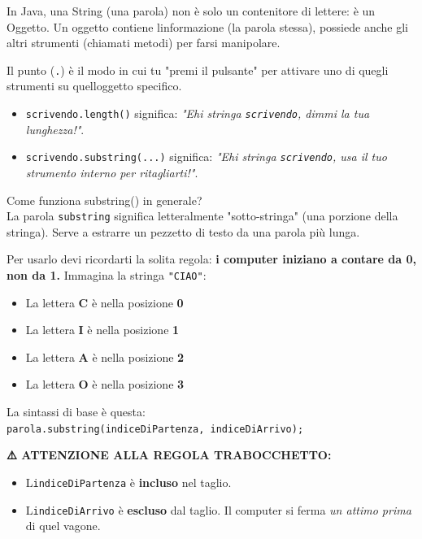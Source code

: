 \documentclass[
]{article}
\begin{document}
In Java, una String (una parola) non è solo un contenitore di lettere: è
un Oggetto. Un oggetto contiene l\textquotesingle informazione (la
parola stessa), possiede anche gli altri strumenti (chiamati metodi) per
farsi manipolare.

Il punto (\texttt{.}) è il modo in cui tu "premi il pulsante" per
attivare uno di quegli strumenti su quell\textquotesingle oggetto
specifico.

\begin{itemize}
\item
  \texttt{scrivendo.length()} significa: \emph{"Ehi stringa
  \texttt{scrivendo}, dimmi la tua lunghezza!"}.
\item
  \texttt{scrivendo.substring(...)} significa: \emph{"Ehi stringa
  \texttt{scrivendo}, usa il tuo strumento interno per ritagliarti!"}.
\end{itemize}

Come funziona substring() in generale?\\
La parola \texttt{substring} significa letteralmente "sotto-stringa"
(una porzione della stringa). Serve a estrarre un pezzetto di testo da
una parola più lunga.

Per usarlo devi ricordarti la solita regola: \textbf{i computer iniziano
a contare da 0, non da 1.} Immagina la stringa \texttt{"CIAO"}:

\begin{itemize}
\item
  La lettera \textbf{C} è nella posizione \textbf{0}
\item
  La lettera \textbf{I} è nella posizione \textbf{1}
\item
  La lettera \textbf{A} è nella posizione \textbf{2}
\item
  La lettera \textbf{O} è nella posizione \textbf{3}
\end{itemize}

La sintassi di base è questa:
\texttt{parola.substring(indiceDiPartenza,\ indiceDiArrivo);}

\textbf{⚠️ ATTENZIONE ALLA REGOLA TRABOCCHETTO:}

\begin{itemize}
\item
  L\textquotesingle{}\texttt{indiceDiPartenza} è \textbf{incluso} nel
  taglio.
\item
  L\textquotesingle{}\texttt{indiceDiArrivo} è \textbf{escluso} dal
  taglio. Il computer si ferma \emph{un attimo prima} di quel vagone.
\end{itemize}
\end{document}
